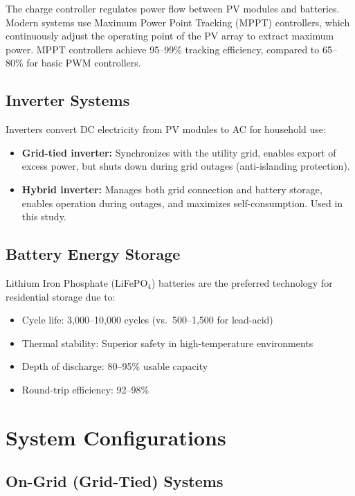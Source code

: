The charge controller regulates power flow between PV modules and batteries. Modern systems use Maximum Power Point Tracking (MPPT) controllers, which continuously adjust the operating point of the PV array to extract maximum power. MPPT controllers achieve 95--99\% tracking efficiency, compared to 65--80\% for basic PWM controllers.

\subsection{Inverter Systems}

Inverters convert DC electricity from PV modules to AC for household use:
\begin{itemize}
    \item \textbf{Grid-tied inverter:} Synchronizes with the utility grid, enables export of excess power, but shuts down during grid outages (anti-islanding protection).
    \item \textbf{Hybrid inverter:} Manages both grid connection and battery storage, enables operation during outages, and maximizes self-consumption. Used in this study.
\end{itemize}

\subsection{Battery Energy Storage}

Lithium Iron Phosphate (LiFePO$_4$) batteries are the preferred technology for residential storage due to:
\begin{itemize}
    \item Cycle life: 3,000--10,000 cycles (vs.\ 500--1,500 for lead-acid)
    \item Thermal stability: Superior safety in high-temperature environments
    \item Depth of discharge: 80--95\% usable capacity
    \item Round-trip efficiency: 92--98\%
\end{itemize}


\section{System Configurations}

\subsection{On-Grid (Grid-Tied) Systems}

